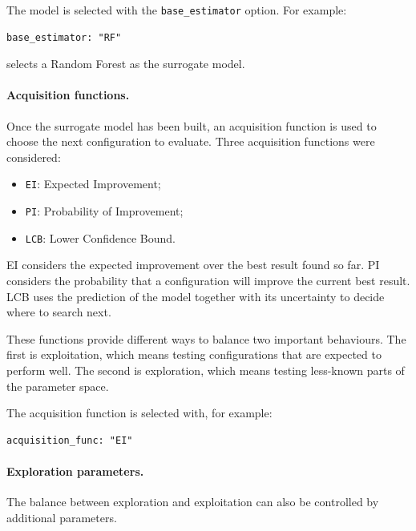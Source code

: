 The model is selected with the \texttt{base\_estimator} option. For
example:

\begin{verbatim}
base_estimator: "RF"
\end{verbatim}

selects a Random Forest as the surrogate model.

\paragraph{Acquisition functions.}

Once the surrogate model has been built, an acquisition function is used
to choose the next configuration to evaluate. Three acquisition
functions were considered:

\begin{itemize}
    \item \texttt{EI}: Expected Improvement;
    \item \texttt{PI}: Probability of Improvement;
    \item \texttt{LCB}: Lower Confidence Bound.
\end{itemize}

EI considers the expected improvement over the best result found so far.
PI considers the probability that a configuration will improve the
current best result. LCB uses the prediction of the model together with
its uncertainty to decide where to search next.

These functions provide different ways to balance two important
behaviours. The first is exploitation, which means testing configurations
that are expected to perform well. The second is exploration, which means
testing less-known parts of the parameter space.

The acquisition function is selected with, for example:

\begin{verbatim}
acquisition_func: "EI"
\end{verbatim}

\paragraph{Exploration parameters.}

The balance between exploration and exploitation can also be controlled
by additional parameters.


